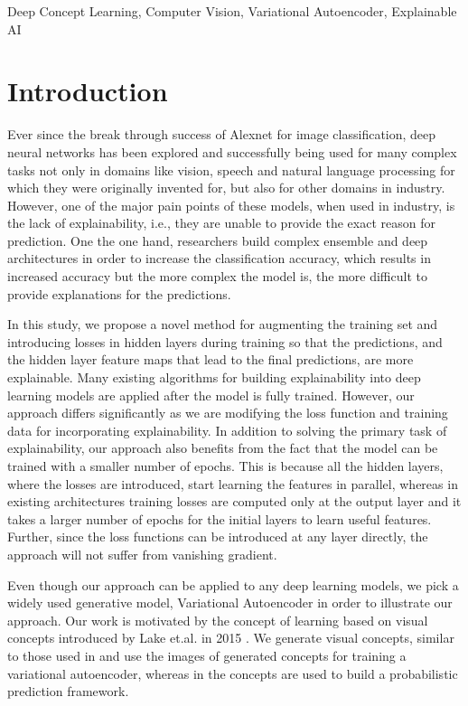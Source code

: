 \documentclass[conference]{IEEEtran}
\begin{document}
\begin{IEEEkeywords}
Deep Concept Learning, Computer Vision, Variational Autoencoder, Explainable AI
\end{IEEEkeywords}

\section{Introduction}
Ever since the break through success of Alexnet \cite{krizhevsky2012imagenet} for image classification, deep neural networks has been explored and successfully being used for many complex tasks not only in domains like  vision, speech and natural language processing for which they were originally invented for, but also for other domains in industry.
However, one of the major pain points of these models, when used in industry, is the lack of explainability, i.e., they are unable to provide the exact reason for prediction.
One the one hand, researchers build complex ensemble and deep architectures in order to increase the classification accuracy, which results in increased accuracy but the more complex the model is, the more difficult to provide explanations for the predictions.

In this study, we propose a novel method for  augmenting the training set and introducing losses in hidden layers during training so that the predictions, and the hidden layer feature maps that lead to the final predictions,  are more explainable.
Many existing algorithms \cite{ribeiro2016should} \cite{lundberg2017unified} \cite{zhou2016learning} for building explainability into deep learning models are applied after the model is fully trained.
However, our approach differs significantly as we are modifying the loss function and training data for incorporating explainability.
In addition to solving  the primary task of explainability, our approach also benefits from the fact that  the model can be trained with a smaller number of epochs.
This is because all the hidden layers, where the losses are introduced,  start learning the features in parallel, whereas in existing architectures training losses are computed only at the output layer and it takes a larger number of epochs for the initial layers to learn useful features.
Further, since the loss functions can be introduced at any layer directly, the approach will not suffer from vanishing gradient.

Even though our approach can be applied to any deep learning models, we pick a widely used generative model, Variational Autoencoder \cite{kingma2013auto} in order to illustrate our approach.
Our work is motivated by the concept of learning based on visual concepts  introduced by Lake et.al. in 2015 \cite{lake2015human}.
We generate visual concepts, similar to those used in \cite{lake2015human} and use the images of generated concepts for training a variational autoencoder, whereas in \cite{lake2015human} the concepts are used to build a probabilistic prediction framework.
\end{document}
